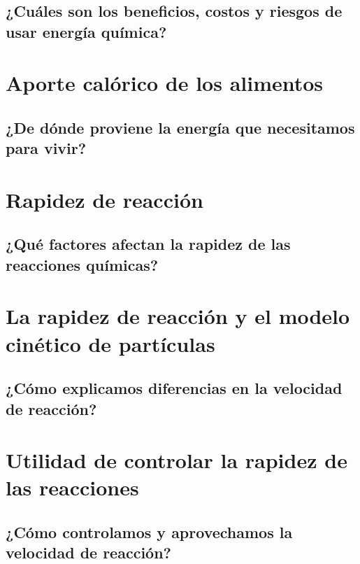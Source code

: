 \documentclass[11pt]{book}
\begin{document}
\subsection{¿Cuáles son los beneficios, costos y riesgos de usar energía química?}

\newpage \thispagestyle{plain}
\section{Aporte calórico de los alimentos}
\subsection{¿De dónde proviene la energía que necesitamos para vivir?}

\newpage \thispagestyle{plain}
\section{Rapidez de reacción}
\subsection{¿Qué factores afectan la rapidez de las reacciones químicas?}

\newpage \thispagestyle{plain}
\section{La rapidez de reacción y el modelo cinético de partículas}
\subsection{¿Cómo explicamos diferencias en la velocidad de reacción?}

\newpage \thispagestyle{plain}
\section{Utilidad de controlar la rapidez de las reacciones}
\subsection{¿Cómo controlamos y aprovechamos la velocidad de reacción?}
\end{document}

